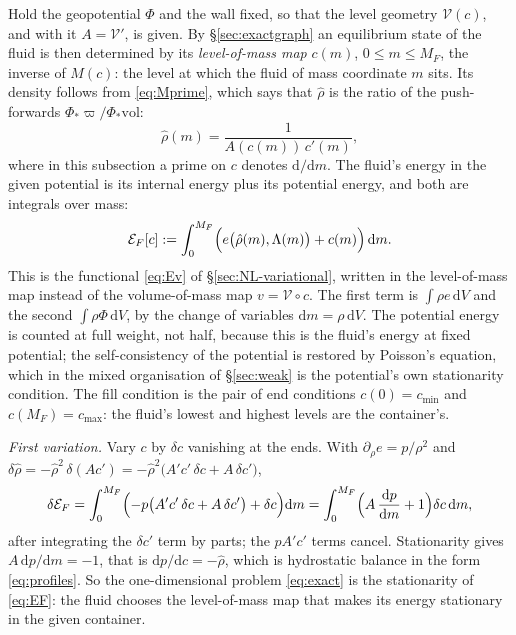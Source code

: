 \documentclass[11pt]{article}
\theoremstyle{definition}
\theoremstyle{remark}
\newcommand{\dV}{\,\mathrm{d}V}
\newcommand{\Vol}{\mathcal V}
\newcommand{\vol}{\mathrm{vol}}
\begin{document}
Hold the geopotential $\Phi$ and the wall fixed, so that the level
geometry $\Vol(c)$, and with it $A = \Vol'$, is given. By
\S\ref{sec:exactgraph} an equilibrium state of the fluid is then
determined by its \emph{level-of-mass map} $c(m)$, $0 \le m \le M_F$,
the inverse of $M(c)$: the level at which the fluid of mass coordinate
$m$ sits. Its density follows from \eqref{eq:Mprime}, which says that
$\hat\rho$ is the ratio of the push-forwards $\Phi_*\varpi/\Phi_*\vol$:
\begin{equation*}
  \hat\rho(m) = \frac{1}{A(c(m))\,c'(m)} ,
\end{equation*}
where in this subsection a prime on $c$ denotes $\mathrm d/\mathrm dm$.
The fluid's energy in the given potential is its internal energy plus
its potential energy, and both are integrals over mass:
\begin{equation}
  \mathcal E_F[c] := \int_0^{M_F}\Bigl(e\bigl(\hat\rho(m), \Lambda(m)\bigr)
  + c(m)\Bigr)\,\mathrm dm .
  \label{eq:EF}
\end{equation}
This is the functional \eqref{eq:Ev} of \S\ref{sec:NL-variational},
written in the level-of-mass map instead of the volume-of-mass map $v =
\Vol\circ c$. The first term is $\int\rho e\dV$ and the second
$\int\rho\Phi\dV$, by the change of variables $\mathrm dm = \rho\dV$.
The potential energy is counted at full weight, not half, because this
is the fluid's energy at fixed potential; the self-consistency of the
potential is restored by Poisson's equation, which in the mixed
organisation of \S\ref{sec:weak} is the potential's own stationarity
condition. The fill condition is the pair of end conditions $c(0) =
c_{\min}$ and $c(M_F) = c_{\max}$: the fluid's lowest and highest levels
are the container's.

\emph{First variation.} Vary $c$ by $\delta c$ vanishing at the ends.
With $\partial_\rho e = p/\rho^2$ and $\delta\hat\rho =
-\hat\rho^2\,\delta(Ac') = -\hat\rho^2\bigl(A'c'\,\delta c + A\,\delta
c'\bigr)$,
\begin{equation*}
  \delta\mathcal E_F
  = \int_0^{M_F}\Bigl(-p\bigl(A'c'\,\delta c + A\,\delta c'\bigr) + \delta c\Bigr)\mathrm dm
  = \int_0^{M_F}\Bigl(A\,\frac{\mathrm dp}{\mathrm dm} + 1\Bigr)\delta c\,\mathrm dm ,
\end{equation*}
after integrating the $\delta c'$ term by parts; the $pA'c'$ terms
cancel. Stationarity gives $A\,\mathrm dp/\mathrm dm = -1$, that is
$\mathrm dp/\mathrm dc = -\hat\rho$, which is hydrostatic balance in the
form \eqref{eq:profiles}. So the one-dimensional problem
\eqref{eq:exact} is the stationarity of \eqref{eq:EF}: the fluid
chooses the level-of-mass map that makes its energy stationary in the
given container.
\end{document}
